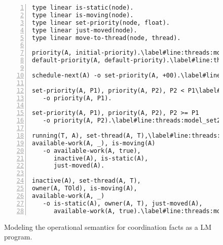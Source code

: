 \begin{figure}[h!]
\begin{Verbatim}[numbers=left,fontsize=\codesize,commandchars=\\\#\&]
type linear is-static(node).
type linear is-moving(node).
type linear set-priority(node, float).
type linear just-moved(node).
type linear move-to-thread(node, thread).

priority(A, initial-priority).\label#line:threads:model_prio&
default-priority(A, default-priority).\label#line:threads:model_defprio&

schedule-next(A) -o set-priority(A, +00).\label#line:threads:model_snext&

set-priority(A, P1), priority(A, P2), P2 < P1\label#line:threads:model_set1&
   -o priority(A, P1).

set-priority(A, P1), priority(A, P2), P2 >= P1
   -o priority(A, P2).\label#line:threads:model_set2&

running(T, A), set-thread(A, T),\label#line:threads:model_thread1&
available-work(A, _), is-moving(A)
   -o available-work(A, true),
      inactive(A), is-static(A),
      just-moved(A).

inactive(A), set-thread(A, T),
owner(A, TOld), is-moving(A),
available-work(A, _)
   -o is-static(A), owner(A, T), just-moved(A),
      available-work(A, true).\label#line:threads:model_thread2&
\end{Verbatim}
\caption{Modeling the operational semantics for coordination facts as a LM
program.}
\label{code:threads:modeling_scheduling}
\end{figure}

